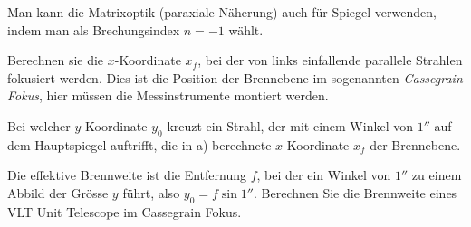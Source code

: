 Man kann die Matrixoptik (paraxiale Näherung) auch für Spiegel verwenden,
indem man als Brechungsindex $n=-1$ wählt.
\begin{teilaufgaben}
\item
Berechnen sie die $x$-Koordinate $x_f$, bei der von links einfallende
parallele Strahlen fokusiert werden.
Dies ist die Position der Brennebene im sogenannten {\em Cassegrain Fokus},
hier müssen die Messinstrumente montiert werden.
\item
Bei welcher $y$-Koordinate $y_0$ kreuzt ein Strahl,
der mit einem Winkel von $1''$
auf dem Hauptspiegel auftrifft, die in a) berechnete $x$-Koordinate $x_f$ der
Brennebene.
\item
Die effektive Brennweite ist die Entfernung $f$, bei der ein Winkel von
$1''$ zu einem Abbild der Grösse $y$ führt, also $y_0=f\sin 1''$.
Berechnen Sie die Brennweite eines VLT Unit Telescope im Cassegrain Fokus.
\end{teilaufgaben}


